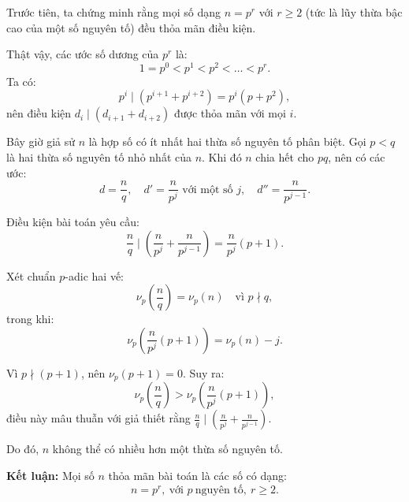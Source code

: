 \documentclass[../06-largest-exponent.tex]{subfiles}
\begin{document}
\begin{soln}\footnotemark
    Trước tiên, ta chứng minh rằng mọi số dạng \( n = p^r \) với \( r \ge 2 \) (tức là lũy thừa bậc cao của một số nguyên tố) đều thỏa mãn điều kiện.

    Thật vậy, các ước số dương của \( p^r \) là:
    \[
        1 = p^0 < p^1 < p^2 < \dots < p^r.
    \]
    Ta có:
    \[
        p^i \mid (p^{i+1} + p^{i+2}) = p^i(p + p^2),
    \]
    nên điều kiện \( d_i \mid (d_{i+1} + d_{i+2}) \) được thỏa mãn với mọi \( i \).

    Bây giờ giả sử \( n \) là hợp số có ít nhất hai thừa số nguyên tố phân biệt. Gọi \( p < q \) là hai thừa số nguyên tố nhỏ nhất của \( n \). Khi đó \( n \) chia hết cho \( pq \), nên có các ước:
    \[
        d = \frac{n}{q}, \quad d' = \frac{n}{p^j} \text{ với một số } j, \quad d'' = \frac{n}{p^{j-1}}.
    \]

    Điều kiện bài toán yêu cầu:
    \[
        \frac{n}{q} \mid \left( \frac{n}{p^j} + \frac{n}{p^{j-1}} \right) = \frac{n}{p^j}(p + 1).
    \]

    Xét chuẩn \( p \)-adic hai vế:
    \[
        \nu_p\left( \frac{n}{q} \right) = \nu_p(n) \quad \text{vì } p \nmid q,
    \]
    trong khi:
    \[
        \nu_p\left( \frac{n}{p^j}(p + 1) \right) = \nu_p(n) - j.
    \]

    Vì \( p \nmid (p + 1) \), nên \( \nu_p(p + 1) = 0 \).  
    Suy ra:
    \[
        \nu_p\left( \frac{n}{q} \right) > \nu_p\left( \frac{n}{p^j}(p + 1) \right),
    \]
    điều này mâu thuẫn với giả thiết rằng \( \frac{n}{q} \mid \left( \frac{n}{p^j} + \frac{n}{p^{j-1}} \right) \).  

    Do đó, \( n \) không thể có nhiều hơn một thừa số nguyên tố.  

    \textbf{Kết luận:} Mọi số \( n \) thỏa mãn bài toán là các số có dạng:
    \[
        \boxed{n = p^r,\ \text{với } p\ \text{nguyên tố},\ r \ge 2.}
    \]
\end{soln}

\end{document}
